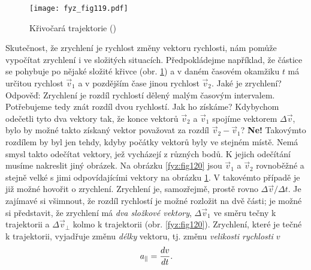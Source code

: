 {    \begin{figure}[ht!]  %
      \centering
      \texttt{[image: fyz\_fig119.pdf]}
      \caption{Křivočará trajektorie
              (\cite[s.~163]{Feynman01})}
      \label{fyz:fig119}
    \end{figure}
    Skutečnost, že zrychlení je rychlost změny vektoru rychlosti, nám pomůže vypočítat zrychlení i 
    ve složitých situacích. Předpokládejme například, že částice se pohybuje po nějaké složité 
    křivce (obr. \ref{fyz:fig119}) a v daném časovém okamžiku \(t\) má určitou rychlost 
    \(\vec{v}_1\) a v pozdějším čase jinou rychlost \(\vec{v}_2\). Jaké je zrychlení? Odpověď: 
    Zrychlení je rozdíl rychlostí dělený malým časovým intervalem. Potřebujeme tedy znát rozdíl 
    dvou rychlostí. Jak ho získáme? Kdybychom odečetli tyto dva vektory tak, že konce vektorů 
    \(\vec{v}_2\) a \(\vec{v}_1\) spojíme vektorem \(\Delta \vec{v}\), bylo by možné takto získaný 
    vektor považovat za rozdíl \(\vec{v}_2 - \vec{v}_1\)? \textbf{Ne!} Takovýmto rozdílem by byl 
    jen tehdy, kdyby počátky vektorů byly ve stejném místě. Nemá smysl takto odečítat vektory, jež 
    vycházejí z různých bodů. K jejich odečítání musíme nakreslit jiný obrázek. Na obrázku 
    \ref{fyz:fig120} jsou \(\vec{v}_1\) a \(\vec{v}_2\) rovnoběžné a stejně velké s jimi 
    odpovídajícími vektory na obrázku \ref{fyz:fig119}. V takovémto případě je již možné hovořit o 
    zrychlení. Zrychlení je, samozřejmě, prostě rovno \(\Delta\vec{v}/\Delta t\). Je zajímavé si 
    všimnout, že rozdíl rychlostí je možné rozložit na dvě části; je možné si představit, že 
    zrychlení má \emph{dva složkové vektory}, \(\Delta\vec{v}_1\) ve směru tečny k trajektorii a 
    \(\Delta\vec{v}_\perp\) kolmo k trajektorii (obr. \ref{fyz:fig120}). Zrychlení, které je tečné 
    k trajektorii, vyjadřuje změnu \emph{délky} vektoru, tj. změnu \emph{velikosti rychlosti \(v\)}
    \begin{equation}\label{FYZ:eq153}
      a_\parallel = \dfrac{d v}{d t}.
    \end{equation}

}

